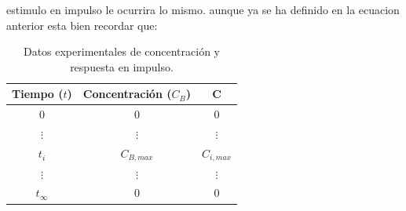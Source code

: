 estimulo en impulso le ocurrira lo mismo. aunque ya se ha definido en la ecuacion anterior esta bien recordar que:
\begin{table}[htbp]
    \centering
    \begin{tabular}{ccc}
        \hline
        \textbf{Tiempo ($t$)} & \textbf{Concentración ($C_{B}$)} & \textbf{C}  \\
        \hline
        0                     & 0                                & 0           \\
        $\vdots$              & $\vdots$                         & $\vdots$    \\
        $t_i$                 & $C_{B,max}$                      & $C_{i,max}$ \\
        $\vdots$              & $\vdots$                         & $\vdots$    \\
        $t_{\infty}$          & 0                                & 0           \\
        \hline
    \end{tabular}
    \caption{Datos experimentales de concentración y respuesta en impulso.}
    \label{tab:concentracion_tiempo_impulso}
\end{table}
